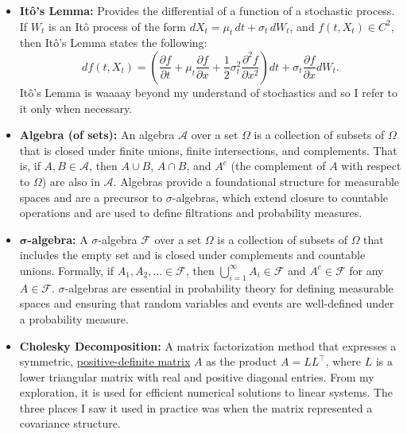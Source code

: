 \documentclass[titlepage]{article}
\begin{document}
\begin{itemize}

    \item \textbf{Itô's Lemma:} \label{sec:ito}Provides the differential of a function of a stochastic process. If $W_t$ is an Itô process of the form $dX_t = \mu_t\,dt + \sigma_t\,dW_t$, and $f(t, X_t) \in C^2$, then Itô’s Lemma states the following:
    \[
    df(t, X_t) = \left( \frac{\partial f}{\partial t} + \mu_t \frac{\partial f}{\partial x} + \frac{1}{2} \sigma_t^2 \frac{\partial^2 f}{\partial x^2} \right) dt + \sigma_t \frac{\partial f}{\partial x} dW_t.
    \]
    Itô's Lemma is waaaay beyond my understand of stochastics and so I refer to it only when necessary.

    \item \textbf{Algebra (of sets):} \label{sec:algebra}An algebra $\mathcal{A}$ over a set $\Omega$ is a collection of subsets of $\Omega$ that is closed under finite unions, finite intersections, and complements. That is, if $A, B \in \mathcal{A}$, then $A \cup B$, $A \cap B$, and $A^c$ (the complement of $A$ with respect to $\Omega$) are also in $\mathcal{A}$. Algebras provide a foundational structure for measurable spaces and are a precursor to $\sigma$-algebras, which extend closure to countable operations and are used to define filtrations and probability measures.
    
    \item \textbf{$\boldsymbol{\sigma}$-algebra:} \label{sec:sigma}A $\sigma$-algebra $\mathcal{F}$ over a set $\Omega$ is a collection of subsets of $\Omega$ that includes the empty set and is closed under complements and countable unions. Formally, if $A_1, A_2, \ldots \in \mathcal{F}$, then $\bigcup_{i=1}^{\infty} A_i \in \mathcal{F}$ and $A^c \in \mathcal{F}$ for any $A \in \mathcal{F}$. $\sigma$-algebras are essential in probability theory for defining measurable spaces and ensuring that random variables and events are well-defined under a probability measure.

    \item \textbf{Cholesky Decomposition:} \label{sec:Cholesky} A matrix factorization method that expresses a symmetric, \href{https://en.wikipedia.org/wiki/Definite_matrix}{positive-definite matrix} $A$ as the product $A = LL^\top$, where $L$ is a lower triangular matrix with real and positive diagonal entries. From my exploration, it is used for efficient numerical solutions to linear systems. The three places I saw it used in practice was when the matrix represented a covariance structure.
    

\end{itemize}
\end{document}
